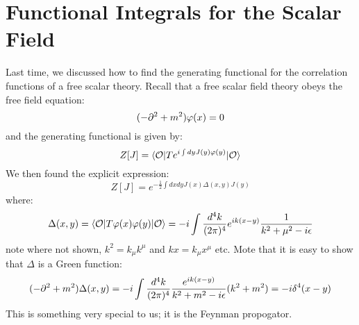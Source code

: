 \section{Functional Integrals for the Scalar Field}

Last time, we discussed how to find the generating functional for the correlation functions of a free scalar theory. Recall that a free scalar field theory obeys the free field equation:
\begin{equation}
    (-\p^2 + m^2)\varphi(x) = 0
\end{equation}
and the generating functional is given by:
\begin{equation}
    Z[J] = \bra{\O}Te^{i \int dy J(y)\varphi(y)}\ket{\O}
\end{equation}
We then found the explicit expression:
\begin{equation}
    Z[J] = e^{-\frac{1}{2}\int dxdy J(x) \Delta(x, y)J(y)}
\end{equation}
where:
\begin{equation}
    \Delta(x, y) = \bra{\O}T\varphi(x)\varphi(y)\ket{\O} = -i \int \frac{d^4k}{(2\pi)^4}e^{ik(x - y)}\frac{1}{k^2 + \mu^2 - i\e}
\end{equation}
note where not shown, $k^2 = k_\mu k^\mu$ and $kx = k_\mu x^\mu$ etc. Mote that it is easy to show that $\Delta$ is a Green function:
\begin{equation}
    (-\partial^2 + m^2)\Delta(x, y) = -i\int \frac{d^4k}{(2\pi)^4}\frac{e^{ik(x-y)}}{k^2 + m^2 - i\epsilon}(k^2 + m^2) = -i\delta^4(x - y)
\end{equation}
This is something very special to us; it is the Feynman propogator. 

